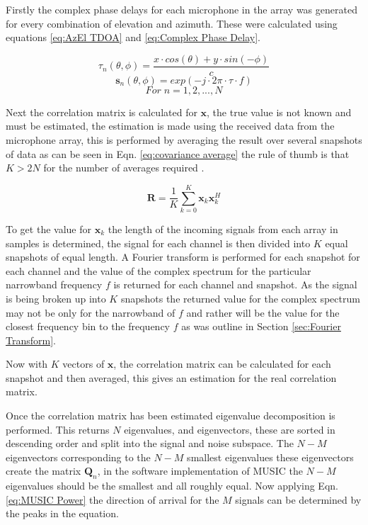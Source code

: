 \documentclass{UoNMCHA}
\numberwithin{equation}{section}
\begin{document}
    Firstly the complex phase delays for each microphone in the array was generated for every combination of elevation and azimuth. These were calculated using equations \ref{eq:AzEl TDOA} and \ref{eq:Complex Phase Delay}.
    
    \begin{equation}
        \tau_n(\theta, \phi) = \frac{x \cdot cos(\theta) + y \cdot sin(-\phi)}{c}
        \label{eq:AzEl TDOA}
    \end{equation}
    \begin{equation}
        \mathbf{s}_n(\theta,\phi) = exp(-j \cdot 2\pi \cdot \tau \cdot f)
        \label{eq:Complex Phase Delay}
    \end{equation}
    \begin{equation*}
        For \; n = 1,2,...,N
    \end{equation*}
    
    Next the correlation matrix is calculated for $\mathbf{x}$, the true value is not known and must be estimated, the estimation is made using the received data from the microphone array, this is performed by averaging the result over several snapshots of data as can be seen in Eqn. \ref{eq:covariance average} the rule of thumb is that $K > 2N$ for the number of averages required \citep{Adv13}. 
    
    \begin{equation}
        \mathbf{R} = \frac{1}{K}\sum_{k=0}^K\mathbf{x}_k\mathbf{x}_k^H
        \label{eq:covariance average}
    \end{equation}
    
    To get the value for $\mathbf{x}_k$ the length of the incoming signals from each array in samples is determined, the signal for each channel is then divided into $K$ equal snapshots of equal length. A Fourier transform is performed for each snapshot for each channel and the value of the complex spectrum for the particular narrowband frequency $f$ is returned for each channel and snapshot. As the signal is being broken up into $K$ snapshots the returned value for the complex spectrum may not be only for the narrowband of $f$ and rather will be the value for the closest frequency bin to the frequency $f$ as was outline in Section \ref{sec:Fourier Transform}.
    
    Now with $K$ vectors of $\mathbf{x}$, the correlation matrix can be calculated for each snapshot and then averaged, this gives an estimation for the real correlation matrix.
    
    Once the correlation matrix has been estimated eigenvalue decomposition is performed. This returns $N$ eigenvalues, and eigenvectors, these are sorted in descending order and split into the signal and noise subspace. The $N-M$ eigenvectors corresponding to the $N-M$ smallest eigenvalues these eigenvectors create the matrix $\mathbf{Q}_n$, in the software implementation of MUSIC the $N-M$ eigenvalues should be the smallest and all roughly equal. Now applying Eqn. \ref{eq:MUSIC Power} the direction of arrival for the $M$ signals can be determined by the peaks in the equation. 
    
\end{document}

